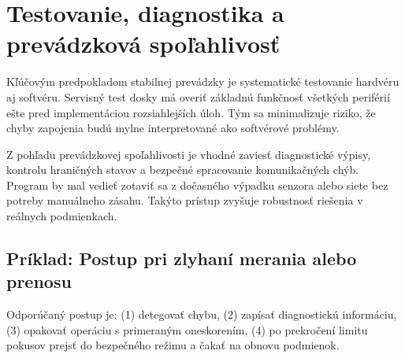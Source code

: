 \section{Testovanie, diagnostika a prevádzková spoľahlivosť}
Kľúčovým predpokladom stabilnej prevádzky je systematické testovanie hardvéru aj softvéru. Servisný test dosky má overiť základnú funkčnosť všetkých periférií ešte pred implementáciou rozsiahlejších úloh. Tým sa minimalizuje riziko, že chyby zapojenia budú mylne interpretované ako softvérové problémy.

Z pohľadu prevádzkovej spoľahlivosti je vhodné zaviesť diagnostické výpisy, kontrolu hraničných stavov a bezpečné spracovanie komunikačných chýb. Program by mal vedieť zotaviť sa z dočasného výpadku senzora alebo siete bez potreby manuálneho zásahu. Takýto prístup zvyšuje robustnosť riešenia v reálnych podmienkach.

\subsection{Príklad: Postup pri zlyhaní merania alebo prenosu}
Odporúčaný postup je: (1) detegovať chybu, (2) zapísať diagnostickú informáciu, (3) opakovať operáciu s primeraným oneskorením, (4) po prekročení limitu pokusov prejsť do bezpečného režimu a čakať na obnovu podmienok.
